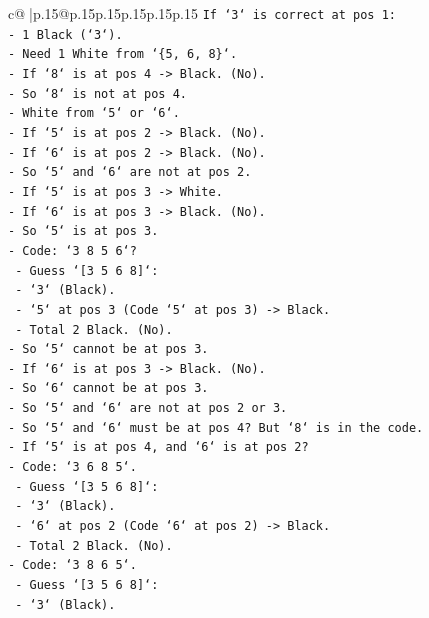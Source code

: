 \documentclass{article}
\begin{document}
{\begin{supertabular}{c@{$\;$}|p{.15\linewidth}@{}p{.15\linewidth}p{.15\linewidth}p{.15\linewidth}p{.15\linewidth}p{.15\linewidth}}
{{{\texttt{If `3` is correct at pos 1:} \\
\texttt{{-} 1 Black (`3`).} \\
\texttt{{-} Need 1 White from `\{5, 6, 8\}`.} \\
\texttt{{-} If `8` is at pos 4 {-}> Black. (No).} \\
\texttt{{-} So `8` is not at pos 4.} \\
\texttt{{-} White from `5` or `6`.} \\
\texttt{{-} If `5` is at pos 2 {-}> Black. (No).} \\
\texttt{{-} If `6` is at pos 2 {-}> Black. (No).} \\
\texttt{{-} So `5` and `6` are not at pos 2.} \\
\texttt{{-} If `5` is at pos 3 {-}> White.} \\
\texttt{{-} If `6` is at pos 3 {-}> Black. (No).} \\
\texttt{{-} So `5` is at pos 3.} \\
\texttt{{-} Code: `3 8 5 6`?} \\
\texttt{    {-} Guess `{[}3 5 6 8{]}`:} \\
\texttt{        {-} `3` (Black).} \\
\texttt{        {-} `5` at pos 3 (Code `5` at pos 3) {-}> Black.} \\
\texttt{        {-} Total 2 Black. (No).} \\
\texttt{{-} So `5` cannot be at pos 3.} \\
\texttt{{-} If `6` is at pos 3 {-}> Black. (No).} \\
\texttt{{-} So `6` cannot be at pos 3.} \\
\texttt{{-} So `5` and `6` are not at pos 2 or 3.} \\
\texttt{{-} So `5` and `6` must be at pos 4? But `8` is in the code.} \\
\texttt{{-} If `5` is at pos 4, and `6` is at pos 2?} \\
\texttt{{-} Code: `3 6 8 5`.} \\
\texttt{    {-} Guess `{[}3 5 6 8{]}`:} \\
\texttt{        {-} `3` (Black).} \\
\texttt{        {-} `6` at pos 2 (Code `6` at pos 2) {-}> Black.} \\
\texttt{        {-} Total 2 Black. (No).} \\
\texttt{{-} Code: `3 8 6 5`.} \\
\texttt{    {-} Guess `{[}3 5 6 8{]}`:} \\
\texttt{        {-} `3` (Black).} \\
}}}
\end{supertabular}}
\end{document}

